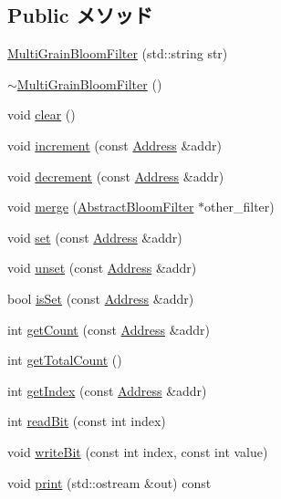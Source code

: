 \subsection*{Public メソッド}
\begin{DoxyCompactItemize}
\item 
\hyperlink{classMultiGrainBloomFilter_adbc5ba0875a5e7782e2b354b98b4941f}{MultiGrainBloomFilter} (std::string str)
\item 
\hyperlink{classMultiGrainBloomFilter_a308a18f368d63eed598f895332c14f6e}{$\sim$MultiGrainBloomFilter} ()
\item 
void \hyperlink{classMultiGrainBloomFilter_ac8bb3912a3ce86b15842e79d0b421204}{clear} ()
\item 
void \hyperlink{classMultiGrainBloomFilter_a3e860ad851b771ac3b6eeb1716eb56bc}{increment} (const \hyperlink{classAddress}{Address} \&addr)
\item 
void \hyperlink{classMultiGrainBloomFilter_addb6b805abb8328082a24926f2bf8c84}{decrement} (const \hyperlink{classAddress}{Address} \&addr)
\item 
void \hyperlink{classMultiGrainBloomFilter_a4091f5f95de040d4e0ae5bd86817b13c}{merge} (\hyperlink{classAbstractBloomFilter}{AbstractBloomFilter} $\ast$other\_\-filter)
\item 
void \hyperlink{classMultiGrainBloomFilter_a2b666fae2a5c2b98bc5cba8e1333bcc9}{set} (const \hyperlink{classAddress}{Address} \&addr)
\item 
void \hyperlink{classMultiGrainBloomFilter_a69b772787ea61467af679e3aa5406b41}{unset} (const \hyperlink{classAddress}{Address} \&addr)
\item 
bool \hyperlink{classMultiGrainBloomFilter_a4200ee289c3d941a4b209c4788f8087c}{isSet} (const \hyperlink{classAddress}{Address} \&addr)
\item 
int \hyperlink{classMultiGrainBloomFilter_abb722634d5846105b673e9496df8d062}{getCount} (const \hyperlink{classAddress}{Address} \&addr)
\item 
int \hyperlink{classMultiGrainBloomFilter_a97f66183ea41a7c123bab9dd5313a74a}{getTotalCount} ()
\item 
int \hyperlink{classMultiGrainBloomFilter_a19f42f6f2fc3501021b768f0df8108b2}{getIndex} (const \hyperlink{classAddress}{Address} \&addr)
\item 
int \hyperlink{classMultiGrainBloomFilter_a6f8a98d0f38a8d122d4cbf87323484eb}{readBit} (const int index)
\item 
void \hyperlink{classMultiGrainBloomFilter_ac188318778d26b44f567c5b530598c16}{writeBit} (const int index, const int value)
\item 
void \hyperlink{classMultiGrainBloomFilter_ac55fe386a101fbae38c716067c9966a0}{print} (std::ostream \&out) const 
\end{DoxyCompactItemize}
